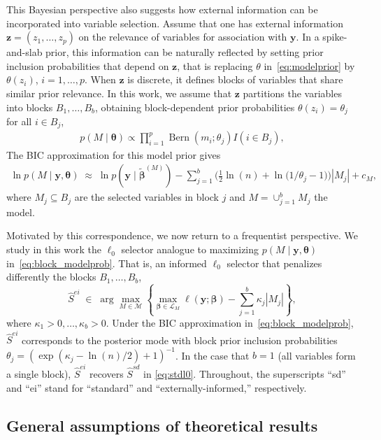\documentclass[
  12pt]{article}
\newcommand{\M}{\mathcal{M}}
\newcommand{\by}{\mathbf{y}}
\newcommand{\bz}{\boldsymbol{z}}
\newcommand{\bbeta}{\boldsymbol{\beta}}
\newcommand{\btheta}{\boldsymbol{\theta}}
\begin{document}
This Bayesian perspective also suggests how external information can be incorporated into variable selection. Assume that one has external information $\bz=(z_1,\ldots,z_p)$ on the relevance of variables for association with $\by$. In a spike-and-slab prior, this information can be naturally reflected by setting prior inclusion probabilities that depend on $\bz$, that is replacing $\theta$ in~\eqref{eq:modelprior} by $\theta(z_i)$, $i=1,\ldots,p$. When $\bz$ is discrete, it defines blocks of variables that share similar prior relevance. In this work, we assume that $\bz$ partitions the variables into blocks $B_1,\ldots,B_b$, 
obtaining block-dependent prior probabilities $\theta(z_i)= \theta_j$ for all $i \in B_j$,
 \begin{eqnarray} \label{eq:block_modelprior}
 p( M \mid \btheta) \propto
         \prod_{i=1}^p \operatorname{Bern}\left(m_i ; \theta_j\right) I(i \in B_j),
\end{eqnarray}
The BIC approximation for this model prior gives
\begin{eqnarray}\label{eq:block_modelprob}
\ln p(M \mid\by, \mathbf{\theta}) \;\approx\; \ln p(\by \mid \tilde{\bbeta}^{(M)}) - \sum_{j=1}^b\Big(\frac{1}{2}\ln(n) +\ln \big(1/\theta_j-1\big)\Big)|M_j| + c_M,
\end{eqnarray}
where $M_j \subseteq B_j$ are
the selected variables in block $j$ and $M=\cup_{j=1}^b M_j$ the model.

Motivated by this correspondence, we now return to a frequentist perspective. We study in this work the $\ell_0$ selector analogue to maximizing $p(M \mid \by, \mathbf{\theta})$ in~\eqref{eq:block_modelprob}. That is, an informed $\ell_0$ selector that penalizes differently the blocks $B_1,\ldots,B_b$,
\begin{equation}\label{eq:Mhat}
  \hat S^{ei}\;\in\;\arg\max_{M\in \M} \left\{\max_{\bbeta\in \mathcal{L}_M}\ell(\by; \bbeta)-\sum_{j=1}^b\kappa_j |M_j| \right\},
\end{equation}
where $\kappa_1>0,\ldots,\kappa_b>0$. Under the BIC approximation in~\eqref{eq:block_modelprob}, $\hat S^{ei}$ corresponds to the posterior mode with block prior inclusion probabilities $\theta_j=(\exp(\kappa_j-\ln(n)/2)+1)^{-1}$. In the case that $b=1$ (all variables form a single block), $\hat S^{ei}$ recovers $\hat{S}^{sd}$ in \eqref{eq:stdl0}. Throughout, the superscripts “sd” and “ei” stand for “standard” and “externally-informed,” respectively.

\subsection{General assumptions of theoretical results}\label{ssec:genassumptions}
\end{document}
